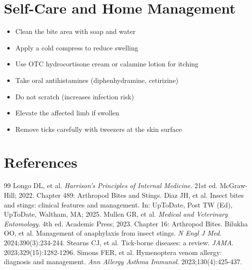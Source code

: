 \section*{Self-Care and Home Management}
\begin{itemize}
\item Clean the bite area with soap and water
\item Apply a cold compress to reduce swelling
\item Use OTC hydrocortisone cream or calamine lotion for itching
\item Take oral antihistamines (diphenhydramine, cetirizine)
\item Do not scratch (increases infection risk)
\item Elevate the affected limb if swollen
\item Remove ticks carefully with tweezers at the skin surface
\end{itemize}

\section*{References}

\begin{thebibliography}{99}
 Longo DL, et al. \emph{Harrison's Principles of Internal Medicine}. 21st ed. McGraw-Hill; 2022. Chapter 489: Arthropod Bites and Stings.
 Diaz JH, et al. Insect bites and stings: clinical features and management. In: UpToDate, Post TW (Ed), UpToDate, Waltham, MA; 2025.
 Mullen GR, et al. \emph{Medical and Veterinary Entomology}. 4th ed. Academic Press; 2023. Chapter 16: Arthropod Bites.
 Bilukha OO, et al. Management of anaphylaxis from insect stings. \emph{N Engl J Med}. 2024;390(3):234-244.
 Stearns CJ, et al. Tick-borne diseases: a review. \emph{JAMA}. 2023;329(15):1282-1296.
 Simons FER, et al. Hymenoptera venom allergy: diagnosis and management. \emph{Ann Allergy Asthma Immunol}. 2023;130(4):425-437.
\end{thebibliography}
